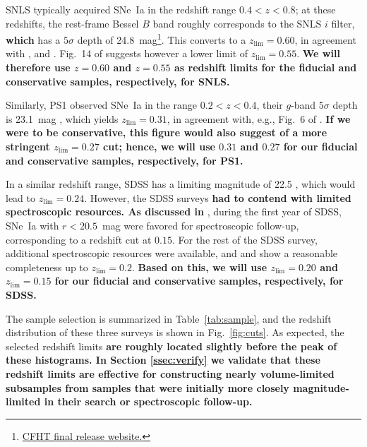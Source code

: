 \documentclass[referee]{aa}
\begin{document}
SNLS typically acquired SNe~Ia in the redshift range $0.4<z<0.8$; at these
redshifts, the rest-frame Bessel $B$ band roughly corresponds to the SNLS $i$
filter, \textbf{which} has a $5\sigma$ depth of
24.8~mag\footnote{\href{https://www.cfht.hawaii.edu/Science/CFHTLS/cfhtlsfinalreleaseexecsummary.html}{CFHT
final release website.}}. This converts to a $z_{\lim}=0.60$, in agreement with
\cite{neill2006}, \cite{perrett2010} and \cite{bazin2011}. Fig.~14 of
\citet[][see their Section~5]{perrett2010} suggests however a lower limit of
$z_{\lim}=0.55$. \textbf{We will therefore use $z=0.60$ and $z=0.55$ as redshift
limits for the fiducial and conservative samples, respectively, for SNLS.}

Similarly, PS1 observed SNe~Ia in the range $0.2<z<0.4$, their $g$-band
$5\sigma$ depth is 23.1~mag \citep{rest2014}, which yields $z_{\lim}=0.31$, in
agreement with, e.g., Fig.~6 of \cite{scolnic2018a}. \textbf{If we were to be
    conservative, this figure would also suggest of a more stringent
$z_{\lim}=0.27$ cut; hence, we will use $0.31$ and $0.27$ for our fiducial and
conservative samples, respectively, for PS1.}

In a similar redshift range, SDSS has a limiting magnitude of 22.5
\citep{dilday2008, sako2008}, which would lead to $z_{\lim}=0.24$. However, the
SDSS surveys \textbf{had to contend with limited spectroscopic resources. As
discussed in} \citet[][Section~2]{kessler2009}, during the first year of SDSS,
SNe~Ia with $r<20.5$~mag were favored for spectroscopic follow-up, corresponding
to a redshift cut at $0.15$. For the rest of the SDSS survey, additional
spectroscopic resources were available, and \cite{kessler2009} and
\cite{dilday2008} show a reasonable completeness up to $z_{\lim}=0.2$.
\textbf{Based on this, we will use $z_{\lim}=0.20$ and $z_{\lim}=0.15$ for our
fiducial and conservative samples, respectively, for SDSS.}

The sample selection is summarized in Table~\ref{tab:sample}, and the redshift
distribution of these three surveys is shown in Fig.~\ref{fig:cuts}. As
expected, the selected redshift limits \textbf{are roughly located slightly
    before the peak of these histograms. In Section \ref{ssec:verify} we
validate that these redshift limits are effective for constructing nearly
volume-limited subsamples from samples that were initially more closely
magnitude-limited in their search or spectroscopic follow-up.}
\end{document}
